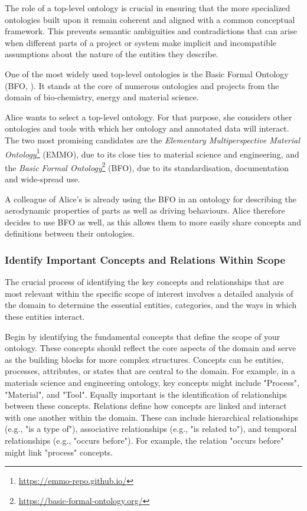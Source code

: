 The role of a top-level ontology is crucial in ensuring that the more specialized ontologies built upon it remain coherent and aligned with a common conceptual framework. This prevents semantic ambiguities and contradictions that can arise when different parts of a project or system make implicit and incompatible assumptions about the nature of the entities they describe.

One of the most widely used top-level ontologies is the Basic Formal Ontology (BFO, \cite{bfo-book}). It stands at the core of numerous ontologies and projects from the domain of bio-chemistry, energy and material science. 

\begin{example}
    Alice wants to select a top-level ontology. For that purpose, she considers other ontologies and tools with which her ontology and annotated data will interact. The two most promising candidates are the \textit{Elementary Multiperspective Material Ontology}\footnote{\url{https://emmo-repo.github.io/}} (EMMO), due to its close ties to material science and engineering, and the \textit{Basic Formal Ontology}\footnote{\url{https://basic-formal-ontology.org/}} (BFO), due to its standardisation, documentation and wide-spread use.
    
    A colleague of Alice's is already using the BFO in an ontology for describing the aerodynamic properties of parts as well as driving behaviours. Alice therefore decides to use BFO as well, as this allows them to more easily share concepts and definitions between their ontologies.
\end{example}

\subsubsection{Identify Important Concepts and Relations Within Scope}

The crucial process of identifying the key concepts and relationships that are most relevant within the specific scope of interest involves a detailed analysis of the domain to determine the essential entities, categories, and the ways in which these entities interact.

Begin by identifying the fundamental concepts that define the scope of your ontology. These concepts should reflect the core aspects of the domain and serve as the building blocks for more complex structures. Concepts can be entities, processes, attributes, or states that are central to the domain. For example, in a materials science and engineering ontology, key concepts might include "Process", "Material", and "Tool". Equally important is the identification of relationships between these concepts. Relations define how concepts are linked and interact with one another within the domain. These can include hierarchical relationships (e.g., "is a type of"), associative relationships (e.g., "is related to"), and temporal relationships (e.g., "occurs before"). For example, the relation "occurs before" might link "process" concepts.

